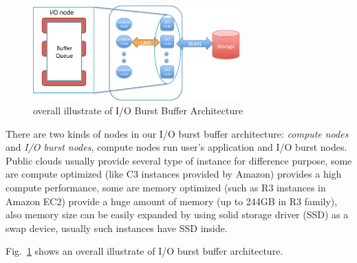 \begin{figure}[tb]
	\centering
	\includegraphics[width=8cm]{img/architecture_overview}
	\caption{overall illustrate of I/O Burst Buffer Architecture}
	\label{architecture:overview}
\end{figure}

There are two kinds of nodes in our I/O burst buffer architecture: \emph{compute nodes} and \emph{I/O burst nodes}, compute nodes run user's application and I/O burst nodes.
Public clouds usually provide several type of instance for difference purpose, some are compute
optimized (like C3 instances provided by Amazon) provides a high compute performance, some are memory optimized (such as R3 instances in Amazon EC2) provide a huge amount of memory (up
to 244GB in R3 family), also memory size can be easily expanded by using solid storage driver (SSD)
as a swap device, usually such instances have SSD inside.

Fig.~\ref{architecture:overview} shows an overall illustrate of I/O burst buffer architecture.